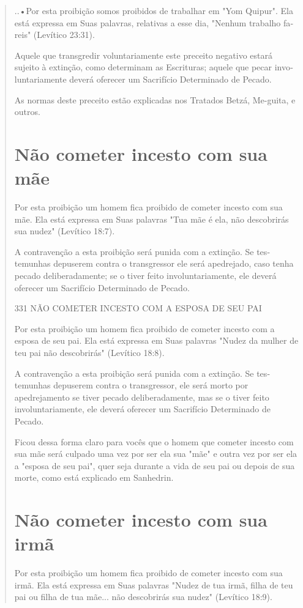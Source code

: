 \begin{quote}
..•Por esta proibição somos proibidos de trabalhar em
"Yom Quipur". Ela está expressa em Suas palavras, relativas a esse dia,
"Nenhum trabalho fa­reis" (Levítico 23:31).

Aquele que transgredir voluntariamente este preceito negativo esta­rá
sujeito à extinção, como determinam as Escrituras; aquele que pecar
invo­luntariamente deverá oferecer um Sacrifício Determinado de Pecado.

As normas deste preceito estão explicadas nos Tratados Betzá, Me-guita,
e outros.

\section{Não cometer incesto com sua mãe}

Por esta proibição um homem fica proibido de cometer incesto com sua
mãe. Ela está expressa em Suas palavras "Tua mãe é ela, não descobrirás
sua nudez" (Levítico 18:7).

A contravenção a esta proibição será punida com a extinção. Se
tes­temunhas depuserem contra o transgressor ele será apedrejado, caso
tenha pe­cado deliberadamente; se o tiver feito involuntariamente, ele
deverá oferecer um Sacrifício Determinado de Pecado.

331 NÃO COMETER INCESTO COM A ESPOSA DE SEU PAI

Por esta proibição um homem fica proibido de cometer incesto com a
esposa de seu pai. Ela está expressa em Suas palavras "Nudez da mulher
de teu pai não descobrirás" (Levítico 18:8).

A contravenção a esta proibição será punida com a extinção. Se
tes­temunhas depuserem contra o transgressor, ele será morto por
apedrejamento se tiver pecado deliberadamente, mas se o tiver feito
involuntariamente, ele de­verá oferecer um Sacrifício Determinado de
Pecado.

Ficou dessa forma claro para vocês que o homem que cometer in­cesto com
sua mãe será culpado uma vez por ser ela sua "mãe" e outra vez por ser
ela a "esposa de seu pai", quer seja durante a vida de seu pai ou depois
de sua morte, como está explicado em Sanhedrin.

\section{Não cometer incesto com sua irmã}

Por esta proibição um homem fica proibido de cometer incesto com sua
irmã. Ela está expressa em Suas palavras "Nudez de tua irmã, filha de
teu pai ou filha de tua mãe... não descobrirás sua nudez" (Levítico
18:9).


\end{quote}
